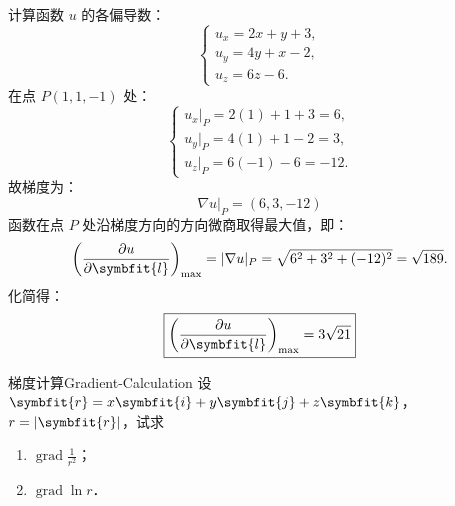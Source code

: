 \begin{solution}
    计算函数 $u$ 的各偏导数：
    \begin{equation}
        \begin{cases}
            u_x = 2x + y + 3, \\
            u_y = 4y + x - 2, \\
            u_z = 6z - 6.
        \end{cases}
    \end{equation}
    在点 $P(1, 1, -1)$ 处：
    \begin{equation}
        \begin{cases}
            u_x|_P = 2(1) + 1 + 3 = 6, \\
            u_y|_P = 4(1) + 1 - 2 = 3, \\
            u_z|_P = 6(-1) - 6 = -12.
        \end{cases}
    \end{equation}
    故梯度为：
    \begin{equation}
        \boxed{\nabla u|_P = (6, 3, -12)}
    \end{equation}
    函数在点 $P$ 处沿梯度方向的方向微商取得最大值，即：
    \begin{equation}
        \left( \frac{\partial u}{\partial \symbfit{l}} \right)_{\max} = |\nabla u|_P = \sqrt{6^2 + 3^2 + (-12)^2} = \sqrt{189}.
    \end{equation}
    化简得：
    \begin{equation}
        \boxed{\left( \frac{\partial u}{\partial \symbfit{l}} \right)_{\max} = 3\sqrt{21}}
    \end{equation}
\end{solution}


\begin{problem}{梯度计算}{Gradient-Calculation}
    设 $\symbfit{r} = x\symbfit{i} + y\symbfit{j} + z\symbfit{k}$，$r = |\symbfit{r}|$，试求
    \begin{enumerate}
        \item $\operatorname{grad} \frac{1}{r^2}$；
        \item $\operatorname{grad} \ln r$．
    \end{enumerate}
\end{problem}

